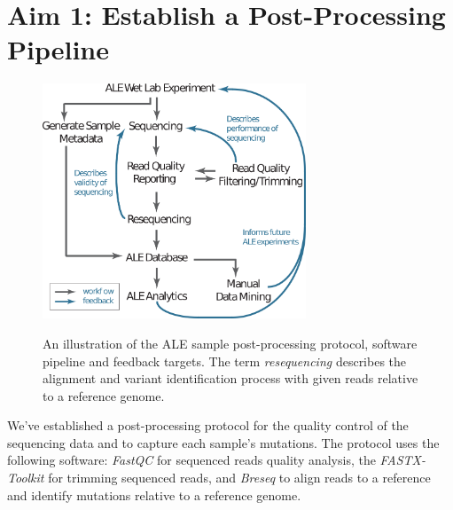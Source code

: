 \documentclass[12pt,final,masters,chapterheads]{ucsd}  %
\begin{document}


\chapter{Aim 1: Establish a Post-Processing Pipeline}


\begin{figure}[h!]
  \caption{An illustration of the ALE sample post-processing protocol, software pipeline and feedback targets. The term \textit{resequencing} describes the alignment and variant identification process with given reads relative to a reference genome.}
  \centering
  \includegraphics[width=0.7\textwidth]{post_processing_protocol.png}
  \label{fig:post_processing_protocol}
\end{figure}

We've established a post-processing protocol for the quality control of the sequencing data and to capture each sample's mutations. The protocol uses the following software: \textit{FastQC} \cite{Andrew:2010:Online} for sequenced reads quality analysis, the \textit{FASTX-Toolkit} \cite{FASTX-Toolkit} for trimming sequenced reads, and \textit{Breseq} \cite{breseq_paper} to align reads to a reference and identify mutations relative to a reference genome.
\end{document}
